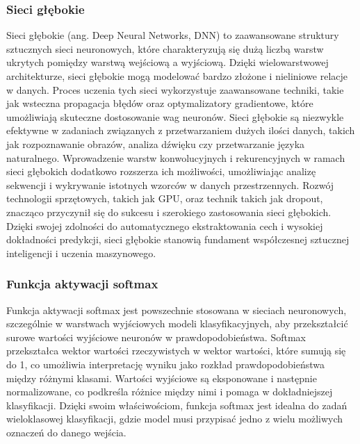 \subsubsection{Sieci głębokie}
Sieci głębokie (ang. Deep Neural Networks, DNN) to zaawansowane struktury sztucznych sieci neuronowych, które charakteryzują się dużą liczbą warstw ukrytych pomiędzy warstwą wejściową a wyjściową. Dzięki wielowarstwowej architekturze, sieci głębokie mogą modelować bardzo złożone i nieliniowe relacje w danych. Proces uczenia tych sieci wykorzystuje zaawansowane techniki, takie jak wsteczna propagacja błędów oraz optymalizatory gradientowe, które umożliwiają skuteczne dostosowanie wag neuronów. Sieci głębokie są niezwykle efektywne w zadaniach związanych z przetwarzaniem dużych ilości danych, takich jak rozpoznawanie obrazów, analiza dźwięku czy przetwarzanie języka naturalnego. Wprowadzenie warstw konwolucyjnych i rekurencyjnych w ramach sieci głębokich dodatkowo rozszerza ich możliwości, umożliwiając analizę sekwencji i wykrywanie istotnych wzorców w danych przestrzennych. Rozwój technologii sprzętowych, takich jak GPU, oraz technik takich jak dropout, znacząco przyczynił się do sukcesu i szerokiego zastosowania sieci głębokich. Dzięki swojej zdolności do automatycznego ekstraktowania cech i wysokiej dokładności predykcji, sieci głębokie stanowią fundament współczesnej sztucznej inteligencji i uczenia maszynowego.

\subsubsection{Funkcja aktywacji softmax}
Funkcja aktywacji softmax jest powszechnie stosowana w sieciach neuronowych, szczególnie w warstwach wyjściowych modeli klasyfikacyjnych, aby przekształcić surowe wartości wyjściowe neuronów w prawdopodobieństwa. Softmax przekształca wektor wartości rzeczywistych w wektor wartości, które sumują się do 1, co umożliwia interpretację wyniku jako rozkład prawdopodobieństwa między różnymi klasami. Wartości wyjściowe są eksponowane i następnie normalizowane, co podkreśla różnice między nimi i pomaga w dokładniejszej klasyfikacji. Dzięki swoim właściwościom, funkcja softmax jest idealna do zadań wieloklasowej klasyfikacji, gdzie model musi przypisać jedno z wielu możliwych oznaczeń do danego wejścia.